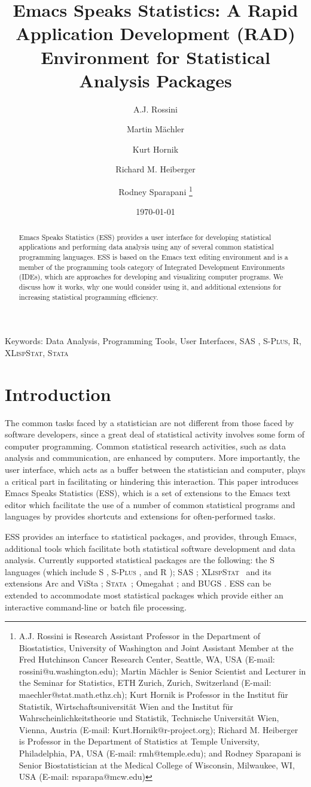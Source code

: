 \documentclass{article}
\title{Emacs Speaks Statistics:  A Rapid Application Development (RAD)
  Environment for Statistical Analysis Packages}
\author{A.J. Rossini \and Martin M{\"a}chler \and Kurt Hornik \and Richard
  M. Heiberger \and Rodney Sparapani \footnote{%
    A.J. Rossini is Research Assistant Professor in the Department of
    Biostatistics, University of Washington and Joint Assistant Member at
    the Fred Hutchinson Cancer Research Center, Seattle, WA, USA
    (E-mail: rossini@u.washington.edu);
    Martin M{\"a}chler is Senior Scientist and Lecturer in the Seminar for
    Statistics, ETH Zurich, Zurich, Switzerland
    (E-mail: maechler@stat.math.ethz.ch);
    Kurt Hornik is Professor in the Institut f{\"u}r Statistik,
    Wirtschaftsuniversit{\"a}t Wien and the Institut f{\"u}r
    Wahrscheinlichkeitstheorie und Statistik, Technische Universit{\"a}t
    Wien, Vienna, Austria (E-mail: Kurt.Hornik@r-project.org);
    Richard M. Heiberger is Professor in the Department of Statistics at
    Temple University, Philadelphia, PA, USA (E-mail: rmh@temple.edu);
    and Rodney Sparapani is Senior Biostatistician at the Medical College
    of Wisconsin, Milwaukee, WI, USA (E-mail: rsparapa@mcw.edu)}}
\date{\today}
\newcommand*{\SAS}{\textsc{SAS}{\textregistered} }
\newcommand*{\Splus}{\textsc{S-Plus}}
\newcommand*{\XLispStat}{\textsc{XLispStat}}
\newcommand*{\Stata}{\textsc{Stata}}
\begin{document}
\maketitle

\begin{abstract}
  Emacs Speaks Statistics (ESS) provides a user interface for
  developing statistical applications and performing data analysis
  using any of several common statistical programming languages.  ESS
  is based on the Emacs text editing environment and is a member of
  the programming tools category of Integrated Development
  Environments (IDEs), which are approaches for developing and
  visualizing computer programs.  We discuss how it works, why one
  would consider using it, and additional extensions for increasing
  statistical programming efficiency.
\end{abstract}

\noindent Keywords: Data Analysis, Programming Tools, User Interfaces, \SAS,
\Splus, R, \XLispStat, \Stata

\baselineskip=2pc

\section{Introduction}
\label{sec:introduction}

The common tasks faced by a statistician are not different from those
faced by software developers, since a great deal of statistical
activity involves some form of computer programming.  Common
statistical research activities, such as data analysis and
communication, are enhanced by computers.  More importantly, the user
interface, which acts as a buffer between the statistician and
computer, plays a critical part in facilitating or hindering this
interaction.  This paper introduces Emacs Speaks Statistics (ESS),
which is a set of extensions to the Emacs text editor which facilitate
the use of a number of common statistical programs and languages by
provides shortcuts and extensions for often-performed tasks.


ESS provides an interface to statistical packages, and provides,
through Emacs, additional tools which facilitate both statistical
software development and data analysis.  Currently supported
statistical packages are the following: the S languages (which include
S \citep{BecRCW88,ChaJH92,ChaJ98}, \Splus{} \citep{Splus}, and R
\citep{ihak:gent:1996}); \SAS \citep{SAS:8.0}; \XLispStat\ 
\citep{Tier90} and its extensions Arc \citep{Cook:Weisberg:1999} and
ViSta \citep{youn:fald:mcfa:1992}; \Stata\ \citep{Stata:6.0}; Omegahat
\citep{DTLang:2000}; and BUGS \citep{SpieThomBest:1999}.  ESS can be
extended to accommodate most statistical packages which provide either
an interactive command-line or batch file processing.
\end{document}
